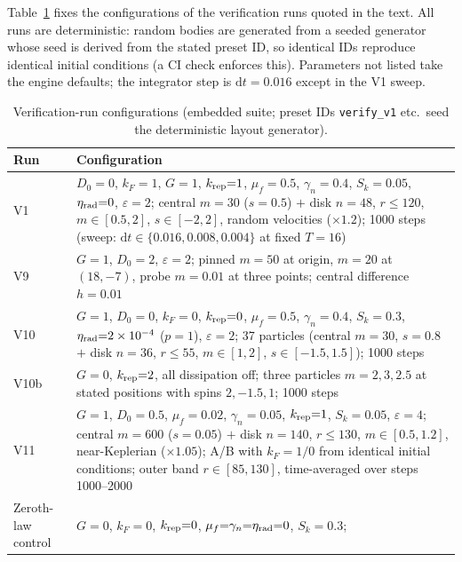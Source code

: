 \documentclass[aps,reprint,amsmath,amssymb,nofootinbib,superscriptaddress,floatfix]{revtex4-2}
\newcommand{\ud}{\mathrm{d}}
\newcommand{\Dz}{D_0}
\begin{document}
Table~\ref{tab:vconfig} fixes the configurations of the verification
runs quoted in the text.
All runs are deterministic: random bodies are generated from a seeded
generator whose seed is derived from the stated preset ID, so
identical IDs reproduce identical initial conditions (a CI check
enforces this).
Parameters not listed take the engine defaults; the integrator step is
$\ud t = 0.016$ except in the V1 sweep.

\begin{table}[h]
\caption{\label{tab:vconfig}%
Verification-run configurations (embedded suite; preset IDs
\texttt{verify\_v1} etc.\ seed the deterministic layout generator).}
\begin{ruledtabular}
\begin{tabular}{p{}p{}}
Run & Configuration \\
\hline
V1 & $\Dz{=}0$, $k_F{=}1$, $G{=}1$, $k_{\rm rep}{=}1$,
$\mu_f{=}0.5$, $\gamma_n{=}0.4$, $S_k{=}0.05$,
$\eta_{\rm rad}{=}0$, $\varepsilon{=}2$; central $m{=}30$
($s{=}0.5$) $+$ disk $n{=}48$, $r{\le}120$, $m\in[0.5,2]$,
$s\in[-2,2]$, random velocities ($\times1.2$); 1000 steps
(sweep: $\ud t \in \{0.016,0.008,0.004\}$ at fixed $T{=}16$) \\
V9 & $G{=}1$, $\Dz{=}2$, $\varepsilon{=}2$; pinned $m{=}50$ at
origin, $m{=}20$ at $(18,-7)$, probe $m{=}0.01$ at three points;
central difference $h{=}0.01$ \\
V10 & $G{=}1$, $\Dz{=}0$, $k_F{=}0$, $k_{\rm rep}{=}0$,
$\mu_f{=}0.5$, $\gamma_n{=}0.4$, $S_k{=}0.3$,
$\eta_{\rm rad}{=}2\times10^{-4}$ ($p{=}1$), $\varepsilon{=}2$;
37 particles (central $m{=}30$, $s{=}0.8$ $+$ disk $n{=}36$,
$r{\le}55$, $m\in[1,2]$, $s\in[-1.5,1.5]$); 1000 steps \\
V10b & $G{=}0$, $k_{\rm rep}{=}2$, all dissipation off; three
particles $m{=}2,3,2.5$ at stated positions with spins
$2,-1.5,1$; 1000 steps \\
V11 & $G{=}1$, $\Dz{=}0.5$, $\mu_f{=}0.02$, $\gamma_n{=}0.05$,
$k_{\rm rep}{=}1$, $S_k{=}0.05$, $\varepsilon{=}4$; central
$m{=}600$ ($s{=}0.05$) $+$ disk $n{=}140$, $r{\le}130$,
$m\in[0.5,1.2]$, near-Keplerian ($\times1.05$); A/B with
$k_F{=}1/0$ from identical initial conditions; outer band
$r\in[85,130]$, time-averaged over steps 1000--2000 \\
Zeroth-law control & $G{=}0$, $k_F{=}0$, $k_{\rm rep}{=}0$,
$\mu_f{=}\gamma_n{=}\eta_{\rm rad}{=}0$, $S_k{=}0.3$;

\end{tabular}
\end{ruledtabular}
\end{table}
\end{document}
